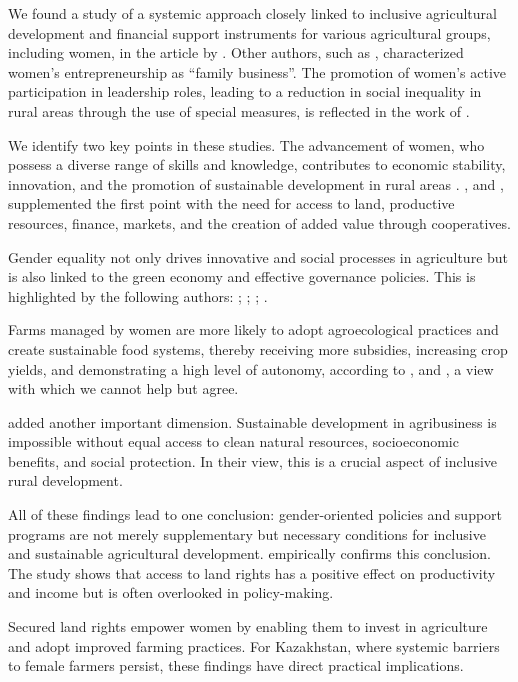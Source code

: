 ﻿\documentclass[pdflatex,sn-mathphys-ay]{sn-jnl}
\begin{document}
We found a study of a systemic approach closely linked to inclusive
agricultural development and financial support instruments for various
agricultural groups, including women, in the article by \citet{ref48}. Other authors, such as \citet{ref11},
characterized women's entrepreneurship as ``family business''. The
promotion of women's active participation in leadership roles, leading
to a reduction in social inequality in rural areas through the use of
special measures, is reflected in the work of \citet{ref82}.

We identify two key points in these studies. The advancement of women,
who possess a diverse range of skills and knowledge, contributes to
economic stability, innovation, and the promotion of sustainable
development in rural areas \citep{ref82}. \citet{ref75}, and \citet{ref02}, supplemented the first point
with the need for access to land, productive resources, finance,
markets, and the creation of added value through cooperatives.

Gender equality not only drives innovative and social processes in
agriculture but is also linked to the green economy and effective
governance policies. This is highlighted by the following authors:
\citet{ref57}; \citet{ref31}; \citet{ref05}; \citet{ref106}.

Farms managed by women are more likely to adopt agroecological practices
and create sustainable food systems, thereby receiving more subsidies,
increasing crop yields, and demonstrating a high level of autonomy,
according to \citet{ref67}, and \citet{ref50},
a view with which we cannot help but agree.

\citet{ref92} added another important dimension.
Sustainable development in agribusiness is impossible without equal
access to clean natural resources, socioeconomic benefits, and social
protection. In their view, this is a crucial aspect of inclusive rural
development.

All of these findings lead to one conclusion: gender-oriented policies and
support programs are not merely supplementary but necessary conditions
for inclusive and sustainable agricultural development. \citet{ref20} empirically confirms this conclusion. The study shows that
access to land rights has a positive effect on productivity and income
but is often overlooked in policy-making.

Secured land rights empower women by enabling them to invest in
agriculture and adopt improved farming practices. For Kazakhstan, where
systemic barriers to female farmers persist, these findings have direct
practical implications.
\end{document}
